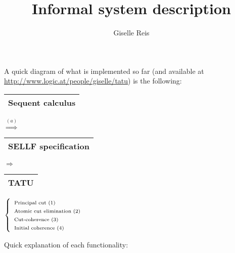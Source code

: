 \documentclass[a4paper, 11pt]{article}
\title{Informal system description}
\author{Giselle Reis}
\begin{document}
\maketitle

A quick diagram of what is implemented so far (and available at
\url{http://www.logic.at/people/giselle/tatu}) is the following:

\vspace{1cm}

\begin{tabular}{|p{1.7cm}|}
\hline
Sequent calculus\\
\hline
\end{tabular}
$\overset{(a)}{\Longrightarrow}$
\begin{tabular}{|p{2.3cm}|}
\hline
SELLF specification\\
\hline
\end{tabular}
$\Longrightarrow$
\begin{tabular}{|p{1.5cm}|}
\hline
\textsf{\textbf{TATU}}\\
\hline
\end{tabular}
$
\left\{
  \begin{array}{l}
  \text{\scriptsize{Principal cut (1)}}\\
  \text{\scriptsize{Atomic cut elimination (2)}}\\
  \text{\scriptsize{Cut-coherence (3)}}\\
  \text{\scriptsize{Initial coherence (4)}}\\
  \end{array}
\right.
$

\vspace{1cm}

Quick explanation of each functionality:
\end{document}

